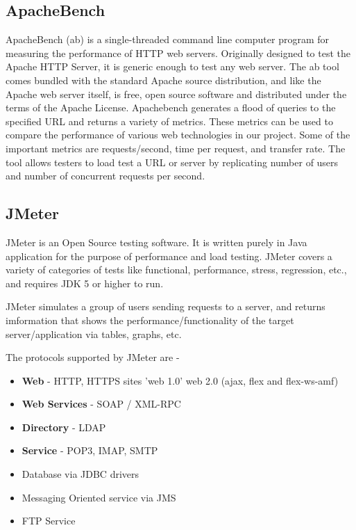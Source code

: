 \documentclass[../thesis.tex]{subfiles}
\begin{document}
\subsection{ApacheBench}
ApacheBench (ab) is a single-threaded command line computer program for measuring the performance of HTTP web servers. Originally designed to test the Apache HTTP Server, it is generic enough to test any web server.
The ab tool comes bundled with the standard Apache source distribution, and like the Apache web server itself, is free, open source software and distributed under the terms of the Apache License. \cite{ab}
Apachebench generates a flood of queries to the specified URL and returns a variety of metrics. These metrics can be used to compare the performance of various web technologies in our project. Some of the important metrics are requests/second, time per request, and transfer rate. The tool allows testers to load test a URL or server by replicating number of users and number of concurrent requests per second.

\subsection{JMeter}
JMeter is an Open Source testing software. It is written purely in Java application for the purpose of performance and load testing. JMeter covers a variety of categories of tests like functional, performance, stress, regression,  etc., and requires JDK 5 or higher to run. \cite{jmeter}
\newline
    
JMeter simulates a group of users sending requests to a server, and returns imformation that shows the performance/functionality of the target server/application via tables, graphs, etc.
\newline
    
    
The protocols supported by JMeter are -

\begin{itemize}
	\item \textbf{Web} - HTTP, HTTPS sites 'web 1.0' web 2.0 (ajax, flex and flex-ws-amf)
  
	\item \textbf{Web Services} - SOAP / XML-RPC

	\item \textbf{Directory} - LDAP
   
	\item \textbf{Service} - POP3, IMAP, SMTP
  
	\item Database via JDBC drivers
    
	\item Messaging Oriented service via JMS
   
	\item FTP Service
\end{itemize}
\end{document}
